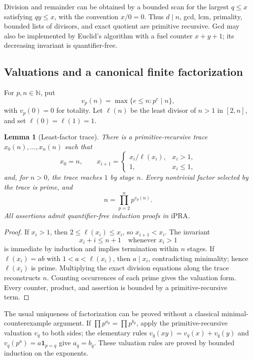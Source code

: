 \documentclass[11pt]{article}
\newtheorem{lemma}[theorem]{Lemma}
\theoremstyle{definition}
\newcommand{\N}{\mathbb N}
\newcommand{\ipra}{\mathrm{iPRA}}
\newcommand{\ind}[1]{\mathbf 1_{#1}}
\begin{document}
Division and remainder can be obtained by a bounded scan for the largest
\(q\le x\) satisfying \(qy\le x\), with the convention \(x/0=0\).  Thus
\(d\mid n\), gcd, lcm, primality, bounded lists of divisors, and exact quotient
are primitive recursive.  Gcd may also be implemented by Euclid's algorithm
with a fuel counter \(x+y+1\); its decreasing invariant is quantifier-free.

\subsection{Valuations and a canonical finite factorization}

For \(p,n\in\N\), put
\[
 v_p(n)=\max\{e\le n:p^e\mid n\},
\]
with \(v_p(0)=0\) for totality.  Let \(\ell(n)\) be the least divisor of
\(n>1\) in \([2,n]\), and set \(\ell(0)=\ell(1)=1\).

\begin{lemma}[Least-factor trace]\label{lem:factor-trace}
There is a primitive-recursive trace \(x_0(n),\ldots,x_n(n)\) such that
\[
 x_0=n,
 \qquad
 x_{i+1}=\begin{cases}x_i/\ell(x_i),&x_i>1,\\1,&x_i\le1,
 \end{cases}
\]
and, for \(n>0\), the trace reaches \(1\) by stage \(n\).  Every nontrivial
factor selected by the trace is prime, and
\[
 n=\prod_{p=2}^{n}p^{v_p(n)}.
\]
All assertions admit quantifier-free induction proofs in \(\ipra\).
\end{lemma}

\begin{proof}
If \(x_i>1\), then \(2\le\ell(x_i)\le x_i\), so
\(x_{i+1}<x_i\).  The invariant
\[
 x_i+i\le n+1\quad\text{whenever }x_i>1
\]
is immediate by induction and implies termination within \(n\) stages.  If
\(\ell(x_i)=ab\) with \(1<a<\ell(x_i)\), then \(a\mid x_i\), contradicting
minimality; hence \(\ell(x_i)\) is prime.  Multiplying the exact division
equations along the trace reconstructs \(n\).  Counting occurrences of each
prime gives the valuation form.  Every counter, product, and assertion is
bounded by a primitive-recursive term.
\end{proof}

The usual uniqueness of factorization can be proved without a classical
minimal-counterexample argument.  If
\(\prod p^{a_p}=\prod p^{b_p}\), apply the primitive-recursive valuation
\(v_q\) to both sides; the elementary rules
\(v_q(xy)=v_q(x)+v_q(y)\) and \(v_q(p^a)=a\ind{p=q}\) give \(a_q=b_q\).
These valuation rules are proved by bounded induction on the exponents.
\end{document}
